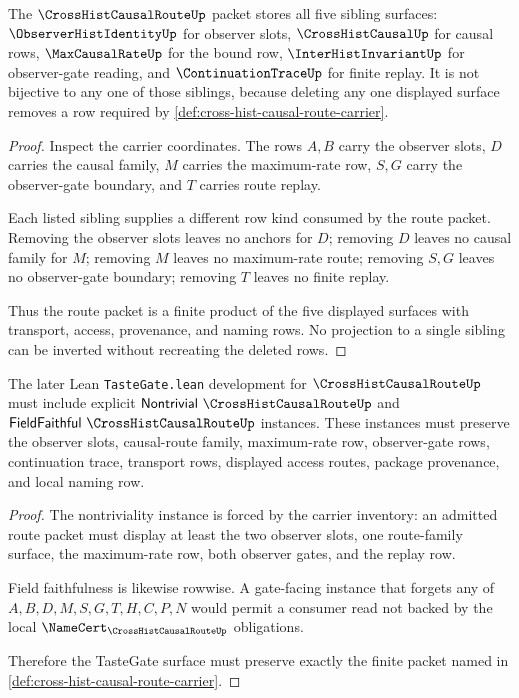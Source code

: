 \begin{theorem}
\label{thm:cross-hist-causal-route-sibling-independence}
The $\CrossHistCausalRouteUp$ packet stores all five sibling surfaces: $\ObserverHistIdentityUp$ for observer slots, $\CrossHistCausalUp$ for causal rows, $\MaxCausalRateUp$ for the bound row, $\InterHistInvariantUp$ for observer-gate reading, and $\ContinuationTraceUp$ for finite replay. It is not bijective to any one of those siblings, because deleting any one displayed surface removes a row required by \autoref{def:cross-hist-causal-route-carrier}.
\end{theorem}
\begin{proof}
Inspect the carrier coordinates. The rows $A,B$ carry the observer slots, $D$ carries the causal family, $M$ carries the maximum-rate row, $S,G$ carry the observer-gate boundary, and $T$ carries route replay.

Each listed sibling supplies a different row kind consumed by the route packet. Removing the observer slots leaves no anchors for $D$; removing $D$ leaves no causal family for $M$; removing $M$ leaves no maximum-rate route; removing $S,G$ leaves no observer-gate boundary; removing $T$ leaves no finite replay.

Thus the route packet is a finite product of the five displayed surfaces with transport, access, provenance, and naming rows. No projection to a single sibling can be inverted without recreating the deleted rows.
\end{proof}

\begin{theorem}
\label{thm:cross-hist-causal-route-tastegate-surface}
The later Lean \texttt{TasteGate.lean} development for $\CrossHistCausalRouteUp$ must include explicit $\mathsf{Nontrivial}\ \CrossHistCausalRouteUp$ and $\mathsf{FieldFaithful}\ \CrossHistCausalRouteUp$ instances. These instances must preserve the observer slots, causal-route family, maximum-rate row, observer-gate rows, continuation trace, transport rows, displayed access routes, package provenance, and local naming row.
\end{theorem}
\begin{proof}
The nontriviality instance is forced by the carrier inventory: an admitted route packet must display at least the two observer slots, one route-family surface, the maximum-rate row, both observer gates, and the replay row.

Field faithfulness is likewise rowwise. A gate-facing instance that forgets any of $A,B,D,M,S,G,T,H,C,P,N$ would permit a consumer read not backed by the local $\NameCert_{\CrossHistCausalRouteUp}$ obligations.

Therefore the TasteGate surface must preserve exactly the finite packet named in \autoref{def:cross-hist-causal-route-carrier}.
\end{proof}


